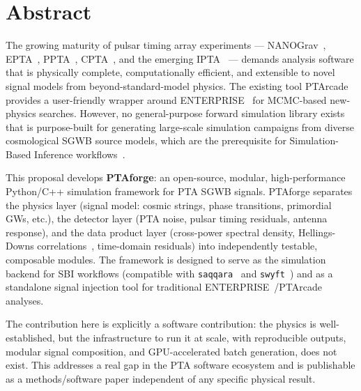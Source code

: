 \section{Abstract}\label{sec:3-abstract}
The growing maturity of pulsar timing array experiments — NANOGrav~\cite{afzal_nanograv_2023}, EPTA~\cite{antoniadis_epta_2023}, PPTA~\cite{reardon_ppta_2023}, CPTA~\cite{xu_cpta_2023}, and the emerging IPTA~\cite{perera_ipta_2019} — demands analysis software that is physically complete, computationally efficient, and extensible to novel signal models from beyond-standard-model physics.
The existing tool PTArcade~\cite{mitridate_ptarcade_2023a} provides a user-friendly wrapper around ENTERPRISE~\cite{ellis_enterprise_2020} for MCMC-based new-physics searches.
However, no general-purpose forward simulation library exists that is purpose-built for generating large-scale simulation campaigns from diverse cosmological SGWB source models, which are the prerequisite for Simulation-Based Inference workflows~\cite{cranmer_frontier_2020}.

This proposal develops \textbf{PTAforge}: an open-source, modular, high-performance Python/C++ simulation framework for PTA SGWB signals.
PTAforge separates the physics layer (signal model: cosmic strings, phase transitions, primordial GWs, etc.), the detector layer (PTA noise, pulsar timing residuals, antenna response), and the data product layer (cross-power spectral density, Hellings-Downs correlations~\cite{hellings_upper_1983}, time-domain residuals) into independently testable, composable modules.
The framework is designed to serve as the simulation backend for SBI workflows (compatible with \texttt{saqqara}~\cite{alvey_simulationbased_2024} and \texttt{swyft}~\cite{miller_swyft_2022}) and as a standalone signal injection tool for traditional ENTERPRISE~\cite{ellis_enterprise_2020}/PTArcade~\cite{mitridate_ptarcade_2023a} analyses.

The contribution here is explicitly a software contribution: the physics is well-established, but the infrastructure to run it at scale, with reproducible outputs, modular signal composition, and GPU-accelerated batch generation, does not exist.
This addresses a real gap in the PTA software ecosystem and is publishable as a methods/software paper independent of any specific physical result.


